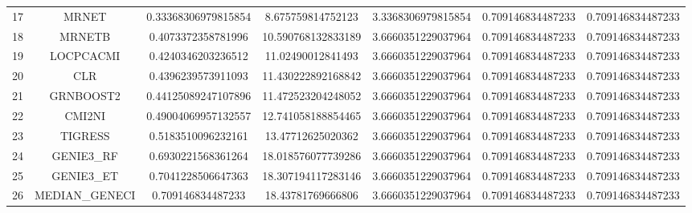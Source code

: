 \documentclass[a4paper,10pt]{article}
\begin{document}
\begin{landscape}
\begin{table}[!htp]
\begin{tabular}{ccccccc}
17&MRNET&0.33368306979815854&8.675759814752123&3.3368306979815854&0.709146834487233&0.709146834487233\\
18&MRNETB&0.4073372358781996&10.590768132833189&3.6660351229037964&0.709146834487233&0.709146834487233\\
19&LOCPCACMI&0.4240346203236512&11.02490012841493&3.6660351229037964&0.709146834487233&0.709146834487233\\
20&CLR&0.4396239573911093&11.430222892168842&3.6660351229037964&0.709146834487233&0.709146834487233\\
21&GRNBOOST2&0.44125089247107896&11.472523204248052&3.6660351229037964&0.709146834487233&0.709146834487233\\
22&CMI2NI&0.49004069957132557&12.741058188854465&3.6660351229037964&0.709146834487233&0.709146834487233\\
23&TIGRESS&0.5183510096232161&13.47712625020362&3.6660351229037964&0.709146834487233&0.709146834487233\\
24&GENIE3_RF&0.6930221568361264&18.018576077739286&3.6660351229037964&0.709146834487233&0.709146834487233\\
25&GENIE3_ET&0.7041228506647363&18.307194117283146&3.6660351229037964&0.709146834487233&0.709146834487233\\
26&MEDIAN_GENECI&0.709146834487233&18.43781769666806&3.6660351229037964&0.709146834487233&0.709146834487233\\
\hline
\end{tabular}
\end{table}


\end{landscape}
\end{document}
